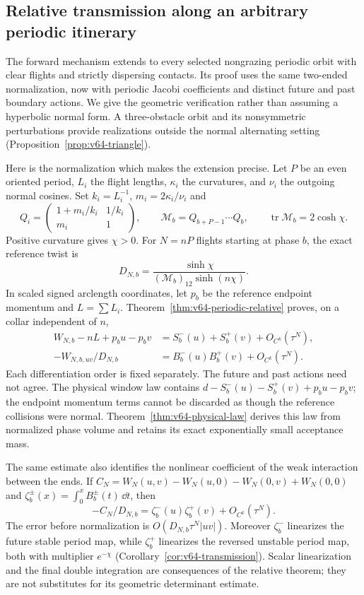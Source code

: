 \subsection{Relative transmission along an arbitrary periodic itinerary}

The forward mechanism extends to every selected nongrazing periodic
orbit with clear flights and strictly dispersing contacts.  Its proof
uses the same two-ended normalization, now with periodic Jacobi
coefficients and distinct future and past boundary actions.  We give
the geometric verification rather than assuming a hyperbolic normal
form.  A three-obstacle orbit and its nonsymmetric perturbations provide
realizations outside the normal alternating setting
(Proposition~\ref{prop:v64-triangle}).

Here is the normalization which makes the extension precise.  Let $P$
be an even oriented period, $L_i$ the flight lengths, $\kappa_i$ the
curvatures, and $\nu_i$ the outgoing normal cosines.  Set
$k_i=L_i^{-1}$, $m_i=2\kappa_i/\nu_i$ and
\[
 Q_i=\begin{pmatrix}1+m_i/k_i&1/k_i\\m_i&1\end{pmatrix},\qquad
 \mathcal M_b=Q_{b+P-1}\cdots Q_b,\qquad
 \operatorname{tr}\mathcal M_b=2\cosh\chi.
\]
Positive curvature gives $\chi>0$.  For $N=nP$ flights starting at
phase $b$, the exact reference twist is
\[
 D_{N,b}=\frac{\sinh\chi}{(\mathcal M_b)_{12}\sinh(n\chi)}.
\]
In scaled signed arclength coordinates, let $p_b$ be the reference
endpoint momentum and $L=\sum L_i$.  Theorem~\ref{thm:v64-periodic-relative}
proves, on a collar independent of $n$,
\begin{equation}\label{eq:v64-intro-relative}
 \begin{split}
 W_{N,b}-nL+p_bu-p_bv
     &=S_b^-(u)+S_b^+(v)+O_{C^k}(\tau^N),\\
 -W_{N,b,uv}/D_{N,b}
     &=B_b^-(u)B_b^+(v)+O_{C^k}(\tau^N).
 \end{split}
\end{equation}
Each differentiation order is fixed separately.  The future and past
actions need not agree.  The physical window law contains
$d-S_b^-(u)-S_b^+(v)+p_bu-p_bv$; the endpoint momentum terms
cannot be discarded as though the reference collisions were normal.
Theorem~\ref{thm:v64-physical-law} derives this law from normalized
phase volume and retains its exact exponentially small acceptance mass.

The same estimate also identifies the nonlinear coefficient of the weak
interaction between the ends.  If
$C_N=W_N(u,v)-W_N(u,0)-W_N(0,v)+W_N(0,0)$ and
$\zeta_b^\pm(x)=\int_0^x B_b^\pm(t)\,\dd t$, then
\[
 -C_N/D_{N,b}=\zeta_b^-(u)\zeta_b^+(v)+O_{C^k}(\tau^N).
\]
The error before normalization is
$O(D_{N,b}\tau^N|uv|)$.  Moreover $\zeta_b^-$ linearizes the
future stable period map, while $\zeta_b^+$ linearizes the reversed
unstable period map, both with multiplier $e^{-\chi}$
(Corollary~\ref{cor:v64-transmission}).  Scalar linearization and
the final double integration are consequences of the relative theorem;
they are not substitutes for its geometric determinant estimate.


